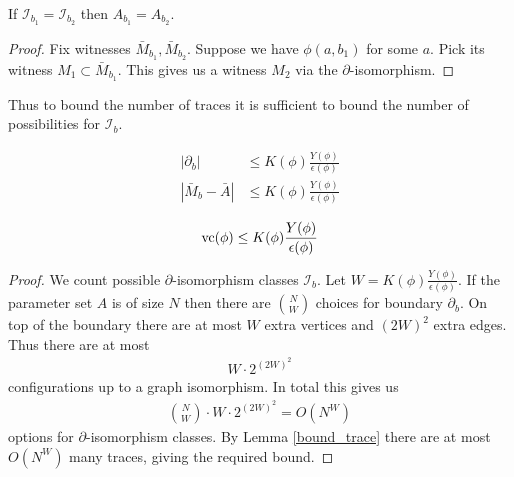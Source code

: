 \documentclass{amsart}
\newcommand{\II}{\mathscr I}
\begin{document}
\begin{Lemma} \label {bound_trace}
	If $\II_{b_1} = \II_{b_2}$ then $A_{b_1} = A_{b_2}$.
\end{Lemma}

\begin{proof}
	Fix witnesses $\bar M_{b_1}, \bar M_{b_2}$.
	Suppose we have $\phi(a, b_1)$ for some $a$.
	Pick its witness $M_1 \subset \bar M_{b_1}$.
	This gives us a witness $M_2$ via the $\partial$-isomorphism.
\end{proof}

Thus to bound the number of traces it is sufficient to bound the number of possibilities for $\II_b$.

\begin{Theorem} \label{main_bound}
	\begin{align*}
		|\partial_b| &\leq K(\phi) \frac{Y(\phi)}{\epsilon(\phi)}\\
		|\bar M_b - \bar A| &\leq K(\phi) \frac{Y(\phi)}{\epsilon(\phi)}
	\end{align*}
\end{Theorem}

\begin{Corollary}
	\begin{align*}
		\operatorname{vc}(\phi) \leq K(\phi) \frac{Y(\phi)}{\epsilon(\phi)}
	\end{align*}
\end{Corollary}

\begin{proof}
		We count possible $\partial$-isomorphism classes $\II_b$.
		Let $W = K(\phi) \frac{Y(\phi)}{\epsilon(\phi)}$.
		If the parameter set $A$ is of size $N$ then there are $N \choose W$ choices for boundary $\partial_b$.
		On top of the boundary there are at most $W$ extra vertices and $(2W)^2$ extra edges.
		Thus there are at most
		\begin{align*}
			W \cdot 2^{(2W)^2}
		\end{align*}
		configurations up to a graph isomorphism.
		In total this gives us 
		\begin{align*}
			{N \choose W} \cdot W \cdot 2^{(2W)^2} = O(N^W)
		\end{align*}
		options for $\partial$-isomorphism classes.
		By Lemma \ref{bound_trace} there are at most $O(N^W)$ many traces, giving the required bound.
\end{proof}
\end{document}
